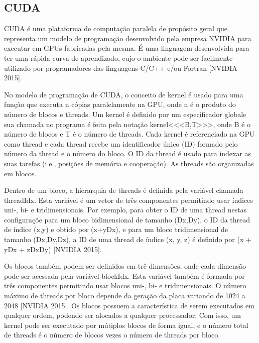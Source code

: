 \subsection{CUDA}

CUDA é uma plataforma de computação paralela de propósito geral que representa um modelo de programação desenvolvido pela empresa NVIDIA para executar em GPUs fabricadas pela mesma. É uma linguagem desenvolvida para ter uma rápida curva de aprendizado, cujo o ambiente pode ser facilmente utilizado por programadores das linguagens C/C++ e/ou Fortran [NVIDIA 2015].

No modelo de programação de CUDA, o conceito de kernel é usado para uma função que executa n cópias paralelamente na GPU, onde n é o produto do número de blocos e threads. Um kernel é definido por um especificador \textunderscore\textunderscore global\textunderscore\textunderscore  e sua chamada no programa é feita pela notação kernel\textless\textless\textless B,T\textgreater\textgreater\textgreater, onde B é o número de blocos e T é o número de threads. Cada kernel é referenciado na GPU como thread e cada thread recebe um identificador único (ID) formado pelo número da thread e o número do bloco. O ID da thread é usado para indexar as suas tarefas (i.e., posições de memória e cooperação). As threads são organizadas em blocos.


Dentro de um bloco, a hierarquia de threads é definida pela variável chamada threadIdx. Esta variável é um vetor de três componentes permitindo usar índices uni-, bi- e tridimensionais. Por exemplo, para obter o ID de uma thread nestas configuraçõe para um bloco bidimensional de tamanho (Dx,Dy), o ID da thread de índice (x,y) e obtido por (x+yDx), e para um bloco tridimensional de tamanho (Dx,Dy,Dz), a ID de uma thread de índice (x, y, z) é definido por (x + yDx + zDxDy) [NVIDIA 2015].


Os blocos também podem ser definidos em trê dimensões, onde cada dimensão pode ser acessada pela variável blockIdx. Esta variável também é formada por três componentes permitindo usar blocos uni-, bi- e tridimensionais. O número máximo de threads por bloco depende da geração da placa variando de 1024 a 2048 [NVIDIA 2015]. Os blocos possuem a característica de serem executados em qualquer ordem, podendo ser alocados a qualquer processador. Com isso, um kernel pode ser executado por mútiplos blocos de forma igual, e o número total de threads é o número de blocos vezes o número de threads por bloco.



